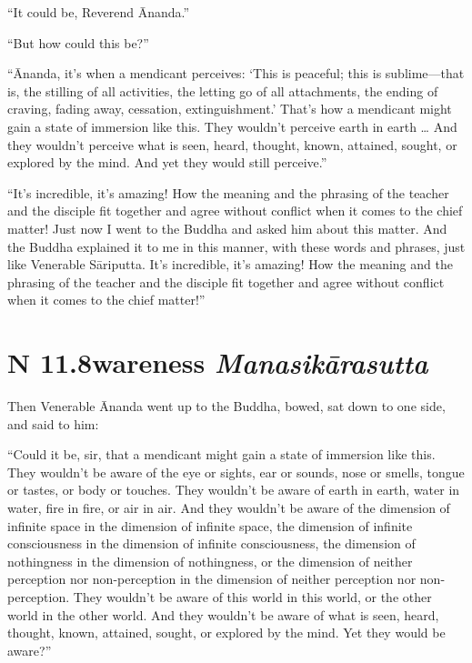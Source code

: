 \documentclass[12pt,openany]{book}%
\newcommand*{\suttatitleacronym}[1]{\smaller[2]{#1}\vspace*{.3em}}
\newcommand*{\suttatitletranslation}[1]{\linebreak{#1}}
\newcommand*{\suttatitleroot}[1]{\linebreak\smaller[2]\itshape{#1}}
\newcommand*{\tocacronym}[1]{\hspace*{-3.3em}{#1}\quad}
\newcommand*{\toctranslation}[1]{#1}
\newcommand*{\tocroot}[1]{(\textit{#1})}
\begin{document}
“It could be, Reverend Ānanda.” 

“But how could this be?” 

“Ānanda, it’s when a mendicant perceives: ‘This is peaceful; this is sublime—that is, the stilling of all activities, the letting go of all attachments, the ending of craving, fading away, cessation, extinguishment.’ That’s how a mendicant might gain a state of immersion like this. They wouldn’t perceive earth in earth … And they wouldn’t perceive what is seen, heard, thought, known, attained, sought, or explored by the mind. And yet they would still perceive.” 

“It’s incredible, it’s amazing! How the meaning and the phrasing of the teacher and the disciple fit together and agree without conflict when it comes to the chief matter! Just now I went to the Buddha and asked him about this matter. And the Buddha explained it to me in this manner, with these words and phrases, just like Venerable \textsanskrit{Sāriputta}. It’s incredible, it’s amazing! How the meaning and the phrasing of the teacher and the disciple fit together and agree without conflict when it comes to the chief matter!” 

%
\section*{{\suttatitleacronym AN 11.8}{\suttatitletranslation Awareness }{\suttatitleroot Manasikārasutta}}
\addcontentsline{toc}{section}{\tocacronym{AN 11.8} \toctranslation{Awareness } \tocroot{Manasikārasutta}}

Then Venerable Ānanda went up to the Buddha, bowed, sat down to one side, and said to him: 

“Could it be, sir, that a mendicant might gain a state of immersion like this. They wouldn’t be aware of the eye or sights, ear or sounds, nose or smells, tongue or tastes, or body or touches. They wouldn’t be aware of earth in earth, water in water, fire in fire, or air in air. And they wouldn’t be aware of the dimension of infinite space in the dimension of infinite space, the dimension of infinite consciousness in the dimension of infinite consciousness, the dimension of nothingness in the dimension of nothingness, or the dimension of neither perception nor non-perception in the dimension of neither perception nor non-perception. They wouldn’t be aware of this world in this world, or the other world in the other world. And they wouldn’t be aware of what is seen, heard, thought, known, attained, sought, or explored by the mind. Yet they would be aware?” 
\end{document}
